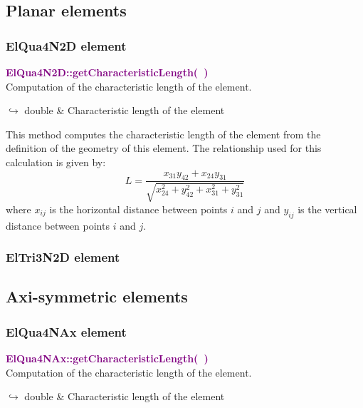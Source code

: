 \subsection{Planar elements}

\subsubsection{ElQua4N2D element}

\textcolor{purple}{\textbf{ElQua4N2D::getCharacteristicLength(~)}}\label{ElQua4N2D::getCharacteristicLength()}\\
Computation of the characteristic length of the element.\vspace*{-0.5em}
\begin{tcolorbox}[grow to left by=-1cm, width=\textwidth-1cm,myArgs,tabularx={l|R}]
$\hookrightarrow$ double & Characteristic length of the element
\end{tcolorbox}

This method computes the characteristic length of the element from the definition of the geometry of this element.
The relationship used for this calculation is given by:
\begin{equation}
L=\frac{x_{31} y_{42}+x_{24} y_{31}}{\sqrt{x_{24}^2+y_{42}^2+x_{31}^2+y_{31}^2}}
\end{equation}
where $x_{ij}$ is the horizontal distance between points $i$ and $j$ and $y_{ij}$ is the vertical distance between points $i$ and $j$.

\subsubsection{ElTri3N2D element}

\subsection{Axi-symmetric elements}

\subsubsection{ElQua4NAx element}

\textcolor{purple}{\textbf{ElQua4NAx::getCharacteristicLength(~)}}\label{ElQua4NAx::getCharacteristicLength()}\\
Computation of the characteristic length of the element.\vspace*{-0.5em}
\begin{tcolorbox}[grow to left by=-1cm, width=\textwidth-1cm,myArgs,tabularx={l|R}]
$\hookrightarrow$ double & Characteristic length of the element
\end{tcolorbox}

